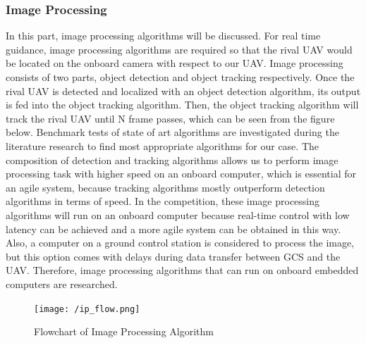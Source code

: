 \documentclass[12pt]{article}
\begin{document}
\subsubsection{Image Processing} 
\justify In this part, image processing algorithms will be discussed. For real time guidance, image processing algorithms are required so that the rival UAV would be located on the onboard camera with respect to our UAV. Image processing consists of two parts, object detection and object tracking respectively. Once the rival UAV is detected and localized with an object detection algorithm, its output is fed into the object tracking algorithm. Then, the object tracking algorithm will track the rival UAV until N frame passes, which can be seen from the figure below. Benchmark tests \cite{isaac2021unmanned,fu2020correlation,nepal2022comparing,redmon2016you,redmon2018yolov3,zhang2018fast,li2020agricultural} of state of art algorithms are investigated during the literature research to find most appropriate algorithms for our case.
\justify The composition of detection and tracking algorithms allows us to perform image processing task with higher speed on an onboard computer, which is essential for an agile system, because tracking algorithms mostly outperform detection algorithms in terms of speed. In the competition, these image processing algorithms will run on an onboard computer because real-time control with low latency can be achieved and a more agile system can be obtained in this way. Also, a computer on a ground control station is considered to process the image, but this option comes with delays during data transfer between GCS and the UAV. Therefore, image processing algorithms that can run on onboard embedded computers are researched. 

\begin{figure}[ht]
 	\centering
 	\texttt{[image: /ip\_flow.png]}
 	\caption{Flowchart of Image Processing Algorithm}
        \label{fig:moment}
 \end{figure}
\FloatBarrier
\end{document}
